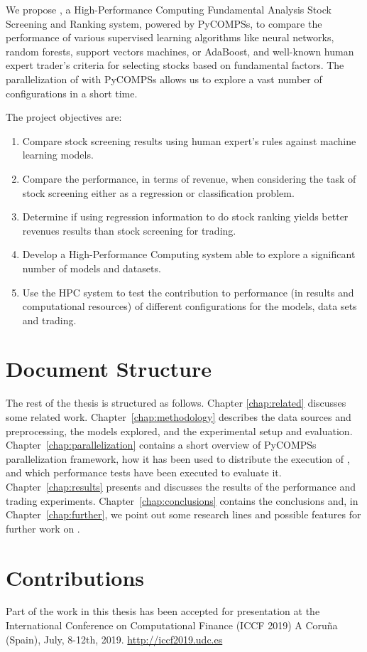 We propose \HPCsys, a High-Performance Computing Fundamental Analysis Stock Screening and Ranking system, powered by PyCOMPSs, to compare the performance
of various supervised learning algorithms like neural networks, random forests, support vectors machines, or AdaBoost, 
and well-known human expert trader's criteria %
for selecting stocks based on fundamental factors. 
The parallelization of \HPCsys with PyCOMPSs allows us to explore a vast number of configurations in a short time.

The project objectives are:

\begin{enumerate}
\item Compare stock screening results using human expert's rules against machine learning models. %
\item Compare the performance, in terms of revenue, when considering the task of stock screening either as a regression or classification problem. %
\item Determine if using regression information to do stock ranking yields better revenues  results than stock screening for trading.


\item Develop a High-Performance Computing system able to explore a significant number of models and datasets.

\item Use the HPC system to test the contribution to performance (in results and computational resources) of different
configurations for the models, data sets and trading.

\end{enumerate}



\section{Document Structure}

The rest of the thesis is structured as follows. Chapter \ref{chap:related} discusses some related work. Chapter~\ref{chap:methodology} describes the data sources and preprocessing, the models explored, and the experimental setup and evaluation. Chapter~\ref{chap:parallelization} contains a short overview of PyCOMPSs parallelization framework, how it has been used to distribute the execution of \HPCsys, and which performance tests have been executed to evaluate it. Chapter~\ref{chap:results} presents and discusses the results of the performance and trading experiments. Chapter~\ref{chap:conclusions} contains the conclusions and, in Chapter~\ref{chap:further}, we point out some research lines and possible features for further work on \HPCsys.

\section{Contributions}
Part of the work in this thesis has been accepted for presentation at the International Conference on Computational Finance (ICCF 2019)
A Coru\~na (Spain), July, 8-12th, 2019. 
\url{http://iccf2019.udc.es}